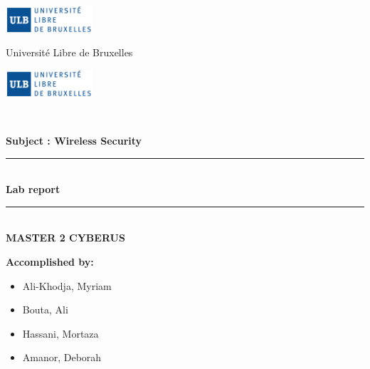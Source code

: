 \documentclass[11pt,a4paper]{report}
\begin{document}
\begin{titlepage}
    \centering
    
	

\begin{minipage}{3cm}
	\begin{center}
		\includegraphics[height=1cm]{LOGO_Universite__libre_bruxelles.png}
	\end{center}
\end{minipage}\hfill
\begin{minipage}{8cm}
    \begin{center}
	
    
	{\small Université Libre de Bruxelles \\ [0.3cm]}
	\end{center}
\end{minipage}\hfill
\begin{minipage}{3cm}
	\begin{center}
		\includegraphics[height=1cm]{LOGO_Universite__libre_bruxelles.png}
	\end{center}
\end{minipage}\hfill\\
\vspace{10mm}


{\large \bfseries{Subject : Wireless Security} \\ }
\begin{center}
   
\end{center}
\vspace{5mm}
\rule{\linewidth}{0.3mm} \\[0.4cm]
{ \huge \bfseries Lab report}
\rule{\linewidth}{0.3mm} \\[1cm]
{\large \bfseries{MASTER 2 CYBERUS} \\ }
\vspace{10mm}


\noindent
\begin{flushleft}
\begin{minipage}{0.5\textwidth}
    \vspace{-3mm}
    \begin{flushleft} \large
        \textbf{Accomplished by:} \\[3mm]
        \begin{itemize}
            \item \textsc Ali-Khodja, Myriam
            \item \textsc Bouta, Ali
            \item \textsc Hassani, Mortaza
            \item \textsc Amanor, Deborah
        \end{itemize}
    \end{flushleft}
\end{minipage}
\end{flushleft}


\end{titlepage}
\end{document}
